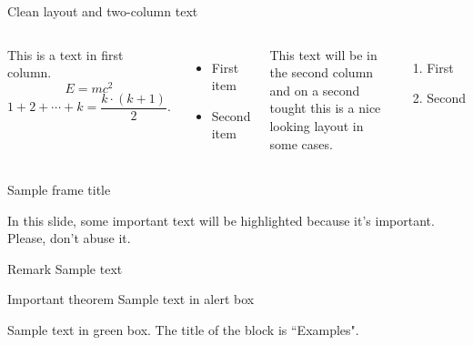 \documentclass[13pt,aspectratio=169,t,xcolor=table]{beamer}
\begin{document}
\begin{frame}{Clean layout and two-column text}
    
    \begin{columns}
    
        This is a text in first column.
        $$E=mc^2$$
        $$ 1 + 2 + \cdots + k =  \frac{k \cdot (k + 1)}{2}.$$
        \begin{itemize}
        \item First item
       
        \item Second item
        \end{itemize}
        
        This text will be in the second column
        and on a second tought this is a nice looking
        layout in some cases.
        
        \begin{enumerate}
            \item First
            \item Second
        \end{enumerate}
        
    \end{columns}
    
\end{frame}


\begin{frame}{Sample frame title}
    
    In this slide, some important text will be
    \alert{highlighted} because it's important. Please, don't abuse it.
    
    \begin{block}{Remark}
        Sample text
    \end{block}
    
    \begin{alertblock}{Important theorem}
        Sample text in alert box
    \end{alertblock}
    
    \begin{examples}
        Sample text in green box. The title of the block is ``Examples".
    \end{examples}
    
\end{frame}
\end{document}

